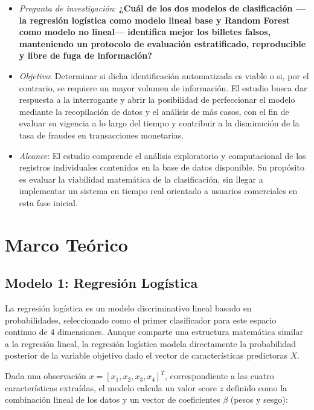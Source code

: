 \documentclass[conference]{IEEEtran}
\begin{document}
	\begin{itemize}
		\item \textit{Pregunta de investigación}: \textbf{¿Cuál de los dos modelos de clasificación —la regresión logística como modelo lineal base y Random Forest como modelo no lineal— identifica mejor los billetes falsos, manteniendo un protocolo de evaluación estratificado, reproducible y libre de fuga de información?}\\
		\item \textit{Objetivo}: Determinar si dicha identificación automatizada es viable o si, por el contrario, se requiere un mayor volumen de información. El estudio busca dar respuesta a la interrogante y abrir la posibilidad de perfeccionar el modelo mediante la recopilación de datos y el análisis de más casos, con el fin de evaluar su vigencia a lo largo del tiempo y contribuir a la disminución de la tasa de fraudes en transacciones monetarias.\\
		\item\textit{ Alcance}: El estudio comprende el análisis exploratorio y computacional de los registros individuales contenidos en la base de datos disponible. Su propósito es evaluar la viabilidad matemática de la clasificación, sin llegar a implementar un sistema en tiempo real orientado a usuarios comerciales en esta fase inicial.
	\end{itemize}
	
	
	
	\section{Marco Teórico}
	\subsection{Modelo 1: Regresión Logística}
	
	La regresión logística es un modelo discriminativo lineal basado en probabilidades, seleccionado como el primer clasificador para este espacio continuo de 4 dimensiones\cite{aws_logistic_regression}. Aunque comparte una estructura matemática similar a la regresión lineal, la regresión logística modela directamente la probabilidad posterior de la variable objetivo dado el vector de características predictoras $X$.
	
	Dada una observación $x = [x_1, x_2, x_3, x_4]^T$, correspondiente a las cuatro características extraídas, el modelo calcula un valor score $z$ definido como la combinación lineal de los datos y un vector de coeficientes $\beta$ (pesos y sesgo):
	
\end{document}
